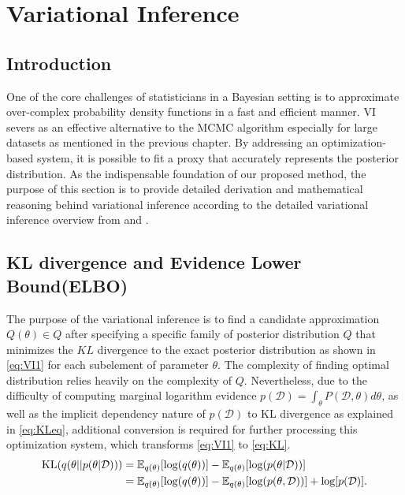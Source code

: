 \section{Variational Inference}
\label{VI}
\subsection{Introduction}
One of the core challenges of statisticians in a Bayesian setting is to approximate over-complex probability density functions in a fast and efficient manner. VI severs as an effective alternative to the MCMC algorithm especially for large datasets as mentioned in the previous chapter. By addressing an optimization-based system, it is possible to fit a proxy that accurately represents the posterior distribution. As the indispensable foundation of our proposed method, the purpose of this section is to provide detailed derivation and mathematical reasoning behind variational inference according to the detailed variational inference overview from \cite{blei_kucukelbir_mcauliffe_2017} and \cite{bishop_2006}.
\subsection{KL divergence and Evidence Lower Bound(ELBO)}
The purpose of the variational inference is to find a candidate approximation $Q(\theta) \in Q$ after specifying a specific family of posterior distribution $Q$ that minimizes the $KL$ divergence to the exact posterior distribution as shown in \autoref{eq:VI1} for each subelement of parameter $\theta$. The complexity of finding optimal distribution relies heavily on the complexity of $Q$. Nevertheless, due to the difficulty of computing marginal logarithm evidence $p(\mathcal{D}) = \int_{\theta} P(\mathcal{D},\theta)d\theta$, as well as the implicit dependency nature of $p(\mathcal{D})$ to KL divergence as explained in \autoref{eq:KLeq}, additional conversion is required for further processing this optimization system, which transforms \autoref{eq:VI1} to \autoref{eq:KL}. 
\begin{equation}
	\label{eq:KLeq}
	\begin{aligned}
		\text{KL}(q(\theta||p(\theta|\mathcal{D}))) &= \mathop{\mathbb{E}_{q(\theta)}}[\textnormal{log}(q(\theta))] - \mathop{\mathbb{E}_{q(\theta)}}[\textnormal{log}(p(\theta|\mathcal{D}))]\\
		& = 
		\mathop{\mathbb{E}_{q(\theta)}}[\textnormal{log}(q(\theta))] - \mathop{\mathbb{E}_{q(\theta)}}[\textnormal{log}(p(\theta,\mathcal{D}))]+ \textnormal{log}[p(\mathcal{D})].\\
	\end{aligned}
\end{equation}
